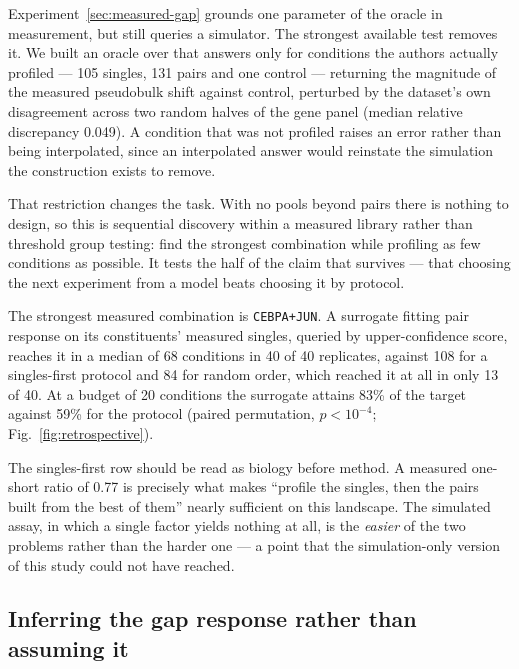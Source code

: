 \documentclass[11pt]{article}
\begin{document}
Experiment~\ref{sec:measured-gap} grounds one parameter of the oracle in
measurement, but still queries a simulator. The strongest available test removes
it. We built an oracle over \citet{norman2019} that answers only for conditions
the authors actually profiled --- 105 singles, 131 pairs and one control ---
returning the magnitude of the measured pseudobulk shift against control,
perturbed by the dataset's own disagreement across two random halves of the gene
panel (median relative discrepancy 0.049). A condition that was not profiled
raises an error rather than being interpolated, since an interpolated answer
would reinstate the simulation the construction exists to remove.

That restriction changes the task. With no pools beyond pairs there is nothing
to design, so this is sequential discovery within a measured library rather than
threshold group testing: find the strongest combination while profiling as few
conditions as possible. It tests the half of the claim that survives --- that
choosing the next experiment from a model beats choosing it by protocol.

The strongest measured combination is \texttt{CEBPA+JUN}. A surrogate fitting
pair response on its constituents' measured singles, queried by
upper-confidence score, reaches it in a median of 68 conditions in 40 of 40
replicates, against 108 for a singles-first protocol and 84 for random order,
which reached it at all in only 13 of 40. At a budget of 20 conditions the
surrogate attains 83\% of the target against 59\% for the protocol (paired
permutation, $p < 10^{-4}$; Fig.~\ref{fig:retrospective}).

The singles-first row should be read as biology before method. A measured
one-short ratio of 0.77 is precisely what makes ``profile the singles, then the
pairs built from the best of them'' nearly sufficient on this landscape. The
simulated assay, in which a single factor yields nothing at all, is the
\emph{easier} of the two problems rather than the harder one --- a point that
the simulation-only version of this study could not have reached.

\subsection{Inferring the gap response rather than assuming it}
\label{sec:latent-gap}
\end{document}
